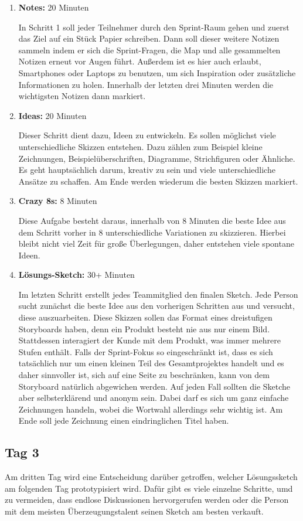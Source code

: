 \begin{enumerate}
	\item \textbf{Notes:} 20 Minuten
	
	In Schritt 1 soll jeder Teilnehmer durch den Sprint-Raum gehen und zuerst das Ziel auf ein Stück Papier schreiben. Dann soll dieser weitere Notizen sammeln indem er sich die Sprint-Fragen, die Map und alle gesammelten Notizen erneut vor Augen führt. Außerdem ist es hier auch erlaubt, Smartphones oder Laptops zu benutzen, um sich Inspiration oder zusätzliche Informationen zu holen. Innerhalb der letzten drei Minuten werden die wichtigsten Notizen dann markiert.
	\item \textbf{Ideas:} 20 Minuten
	
	Dieser Schritt dient dazu, Ideen zu entwickeln. Es sollen möglichst viele unterschiedliche Skizzen entstehen. Dazu zählen zum Beispiel kleine Zeichnungen, Beispielüberschriften, Diagramme, Strichfiguren oder Ähnliche. Es geht hauptsächlich darum, kreativ zu sein und viele unterschiedliche Ansätze zu schaffen. Am Ende werden wiederum die besten Skizzen markiert.
	\item \textbf{Crazy 8s:} 8 Minuten
	
	Diese Aufgabe 	besteht daraus, innerhalb von 8 Minuten die beste Idee aus dem Schritt vorher in 8 unterschiedliche Variationen zu skizzieren. Hierbei bleibt nicht viel Zeit für große Überlegungen, daher entstehen viele spontane Ideen.
	\item \textbf{Lösungs-Sketch:} 30+ Minuten
	
	Im letzten Schritt erstellt jedes Teammitglied den finalen Sketch. Jede Person sucht zunächst die beste Idee aus den vorherigen Schritten aus und versucht, diese auszuarbeiten. Diese Skizzen sollen das Format eines dreistufigen Storyboards haben, denn ein Produkt besteht nie aus nur einem Bild. Stattdessen interagiert der Kunde mit dem Produkt, was immer mehrere Stufen enthält. Falls der Sprint-Fokus so eingeschränkt ist, dass es sich tatsächlich nur um einen kleinen Teil des Gesamtprojektes handelt und es daher sinnvoller ist, sich auf eine Seite zu beschränken, kann von dem Storyboard natürlich abgewichen werden. Auf jeden Fall sollten die Sketche aber selbsterklärend und anonym sein. Dabei darf es sich um ganz einfache Zeichnungen handeln, wobei die Wortwahl allerdings sehr wichtig ist. Am Ende soll jede Zeichnung einen eindringlichen Titel haben.
\end{enumerate}

\subsection*{Tag 3}
Am dritten Tag wird eine Entscheidung darüber getroffen, welcher Lösungssketch am folgenden Tag prototypisiert wird. Dafür gibt es viele einzelne Schritte, umd zu vermeiden, dass endlose Diskussionen hervorgerufen werden oder die Person mit dem meisten Überzeugungstalent seinen Sketch am besten verkauft.


